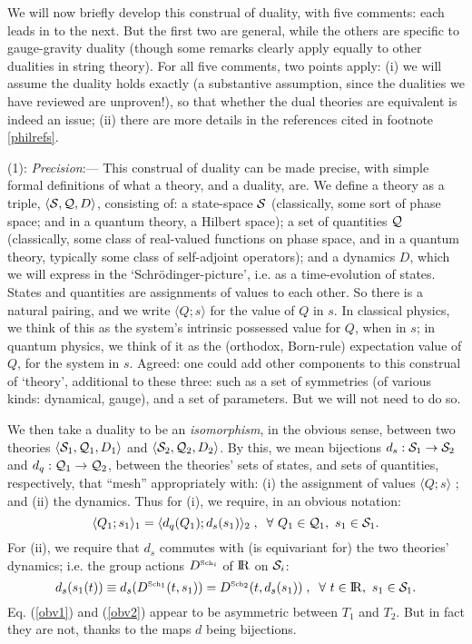 \documentclass[12pt]{article}
\def\be{\begin{equation}}
\def\ee{\end{equation}}
\newcommand\bra[1]{{\langle {#1}|}}
\newcommand\ket[1]{{|{#1}\rangle}}
\def\bra{\langle}
\def\ket{\rangle}
\renewcommand{\^}[1]{\hat{#1}}
\newcommand{\tn}[1]{\mbox{\tiny #1}}
\newcommand{\mathR}{{\rm I\! R}}         %
\begin{document}
We will now briefly develop this construal of duality, with five comments: each leads in to the next. But the first two are general, while the others are specific to gauge-gravity duality (though some remarks clearly apply equally to other dualities in string theory). For all five comments, two points apply: (i) we will assume the duality holds exactly (a substantive assumption, since the dualities we have reviewed are unproven!), so that whether the dual theories are equivalent is indeed an issue; (ii) there are more details in the references cited in footnote \ref{philrefs}. 

(1): {\em Precision}:--- This construal of duality can be made precise, with simple formal definitions of what a theory, and a duality, are. We define a theory as a triple, $\bra{\cal S},{\cal Q},D\ket$,  consisting of: a state-space ${\cal S}$ (classically, some sort of phase space; and in a quantum theory, a Hilbert space); a set of quantities ${\cal Q}$ (classically, some class of real-valued functions on phase space, and in a quantum theory, typically some class of self-adjoint operators); and a dynamics $D$, which we will express in the `Schr\"odinger-picture', i.e. as a time-evolution of states.  States and quantities are assignments of values to each other. So there is a natural pairing, and we write $\langle Q ; s \rangle$ for the value of $Q$ in $s$. In classical physics, we think of this as the system's intrinsic possessed value for $Q$, when in $s$; in quantum physics, we think of it as the (orthodox, Born-rule) expectation value of $Q$, for the system in $s$. Agreed: one could  add other components to this construal of `theory', additional to these three: such as a set of symmetries (of various kinds: dynamical, gauge), and a set of parameters. But we will not need to do so.

We then take a duality to be an {\it isomorphism}, in the obvious sense, between  two theories $\bra{\cal S}_1,{\cal Q}_1,D_1 \ket$ and $\bra{\cal S}_2,{\cal Q}_2,D_2 \ket$. By this, we mean bijections $d_s: {\cal S}_1 \rightarrow {\cal S}_2$ and $d_q: {\cal Q}_1 \rightarrow {\cal Q}_2$, between the theories' sets of states, and sets of quantities, respectively, that ``mesh'' appropriately with: (i) the assignment of values  $\langle Q ; s \rangle$ ; and (ii) the dynamics. Thus for (i), we require, in an obvious notation:
\be\label{obv1}
\langle Q_1; s_1 \rangle_1 = \langle d_q(Q_1) ; d_s(s_1) \rangle_2 \; , \;\; \forall~Q_1 \in {{\cal Q}_1},~s_1 \in {{\cal S}_1}. 
\ee
For  (ii), we require that $d_s$ commutes with (is equivariant for) the two theories' dynamics; i.e. the group actions $D^{\tn{Sch}_i}$ of $\mathR$ on ${\cal S}_i$:
\be\label{obv2}
d_s(s_1(t)) \equiv  d_s(D^{\tn{Sch}_1}(t,s_1)) = D^{\tn{Sch}_2}(t,d_s(s_1)) \; , \;\; \forall~t \in \mathR,~s_1 \in {{\cal S}_1}. 
\ee
Eq. (\ref{obv1}) and (\ref{obv2})  appear to be asymmetric between $T_1$ and $T_2$. But in fact they are not, thanks to the maps $d$ being bijections. 
\end{document}
